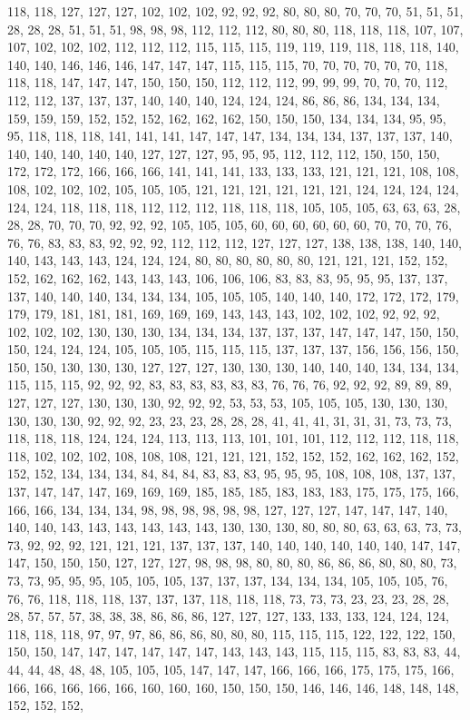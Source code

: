 118, 118, 127, 127, 127, 102, 102, 102, 92, 92, 92, 80, 80, 80, 70, 70, 70, 51, 51, 51, 28, 28, 28, 51, 51, 51, 98, 98, 98, 112, 112, 112, 80, 80, 80, 118, 118, 118, 107, 107, 107, 102, 102, 102, 112, 112, 112, 115, 115, 115, 119, 119, 119, 118, 118, 118, 140, 140, 140, 146, 146, 146, 147, 147, 147, 115, 115, 115, 70, 70, 70, 70, 70, 70, 118, 118, 118, 147, 147, 147, 150, 150, 150, 112, 112, 112, 99, 99, 99, 70, 70, 70, 112, 112, 112, 137, 137, 137, 140, 140, 140, 124, 124, 124, 86, 86, 86, 134, 134, 134, 159, 159, 159, 152, 152, 152, 162, 162, 162, 150, 150, 150, 134, 134, 134, 95, 95, 95, 118, 118, 118, 141, 141, 141, 147, 147, 147, 134, 134, 134, 137, 137, 137, 140, 140, 140, 140, 140, 140, 127, 127, 127, 95, 95, 95, 112, 112, 112, 150, 150, 150, 172, 172, 172, 166, 166, 166, 141, 141, 141, 133, 133, 133, 121, 121, 121, 108, 108, 108, 102, 102, 102, 105, 105, 105, 121, 121, 121, 121, 121, 121, 124, 124, 124, 124, 124, 124, 118, 118, 118, 112, 112, 112, 118, 118, 118, 105, 105, 105, 63, 63, 63, 28, 28, 28, 70, 70, 70, 92, 92, 92, 105, 105, 105, 60, 60, 60, 60, 60, 60, 70, 70, 70, 76, 76, 76, 83, 83, 83, 92, 92, 92, 112, 112, 112, 127, 127, 127, 138, 138, 138, 140, 140, 140, 143, 143, 143, 124, 124, 124, 80, 80, 80, 80, 80, 80, 121, 121, 121, 152, 152, 152, 162, 162, 162, 143, 143, 143, 106, 106, 106, 83, 83, 83, 95, 95, 95, 137, 137, 137, 140, 140, 140, 134, 134, 134, 105, 105, 105, 140, 140, 140, 172, 172, 172, 179, 179, 179, 181, 181, 181, 169, 169, 169, 143, 143, 143, 102, 102, 102, 92, 92, 92, 102, 102, 102, 130, 130, 130, 134, 134, 134, 137, 137, 137, 147, 147, 147, 150, 150, 150, 124, 124, 124, 105, 105, 105, 115, 115, 115, 137, 137, 137, 156, 156, 156, 150, 150, 150, 130, 130, 130, 127, 127, 127, 130, 130, 130, 140, 140, 140, 134, 134, 134, 115, 115, 115, 92, 92, 92, 83, 83, 83, 83, 83, 83, 76, 76, 76, 92, 92, 92, 89, 89, 89, 127, 127, 127, 130, 130, 130, 92, 92, 92, 53, 53, 53, 105, 105, 105, 130, 130, 130, 130, 130, 130, 92, 92, 92, 23, 23, 23, 28, 28, 28, 41, 41, 41, 31, 31, 31, 73, 73, 73, 118, 118, 118, 124, 124, 124, 113, 113, 113, 101, 101, 101, 112, 112, 112, 118, 118, 118, 102, 102, 102, 108, 108, 108, 121, 121, 121, 152, 152, 152, 162, 162, 162, 152, 152, 152, 134, 134, 134, 84, 84, 84, 83, 83, 83, 95, 95, 95, 108, 108, 108, 137, 137, 137, 147, 147, 147, 169, 169, 169, 185, 185, 185, 183, 183, 183, 175, 175, 175, 166, 166, 166, 134, 134, 134, 98, 98, 98, 98, 98, 98, 127, 127, 127, 147, 147, 147, 140, 140, 140, 143, 143, 143, 143, 143, 143, 130, 130, 130, 80, 80, 80, 63, 63, 63, 73, 73, 73, 92, 92, 92, 121, 121, 121, 137, 137, 137, 140, 140, 140, 140, 140, 140, 147, 147, 147, 150, 150, 150, 127, 127, 127, 98, 98, 98, 80, 80, 80, 86, 86, 86, 80, 80, 80, 73, 73, 73, 95, 95, 95, 105, 105, 105, 137, 137, 137, 134, 134, 134, 105, 105, 105, 76, 76, 76, 118, 118, 118, 137, 137, 137, 118, 118, 118, 73, 73, 73, 23, 23, 23, 28, 28, 28, 57, 57, 57, 38, 38, 38, 86, 86, 86, 127, 127, 127, 133, 133, 133, 124, 124, 124, 118, 118, 118, 97, 97, 97, 86, 86, 86, 80, 80, 80, 115, 115, 115, 122, 122, 122, 150, 150, 150, 147, 147, 147, 147, 147, 147, 143, 143, 143, 115, 115, 115, 83, 83, 83, 44, 44, 44, 48, 48, 48, 105, 105, 105, 147, 147, 147, 166, 166, 166, 175, 175, 175, 166, 166, 166, 166, 166, 166, 160, 160, 160, 150, 150, 150, 146, 146, 146, 148, 148, 148, 152, 152, 152, 